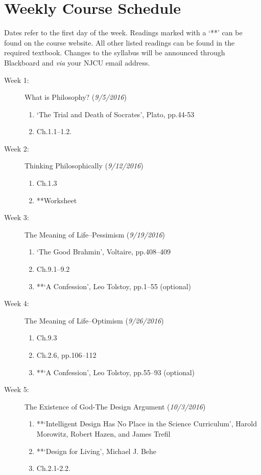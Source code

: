 \documentclass[article,oneside]{memoir}
\begin{document}
\section{Weekly Course Schedule}
Dates refer to the first day of the week. Readings marked with a `**' can be found on the course website. All other listed readings can be found in the required textbook. Changes to the syllabus will be announced through Blackboard and \emph{via} your NJCU email address. \newline





\begin{description}

\item[Week 1: ] What is Philosophy? (\emph{9/5/2016})
\begin{enumerate}
\item `The Trial and Death of Socrates', Plato, pp.44-53
\item Ch.1.1--1.2.
\end{enumerate}

\item[Week 2:]  Thinking Philosophically (\emph{9/12/2016})
\begin{enumerate}
\item Ch.1.3
\item **Worksheet
\end{enumerate}

\item[Week 3:]  The Meaning of Life--Pessimism (\emph{9/19/2016})
\begin{enumerate}
\item `The Good Brahmin', Voltaire, pp.408--409
\item Ch.9.1--9.2 
\item **`A Confession', Leo Tolstoy, pp.1--55 (optional)
\end{enumerate}

\item[Week 4: ] The Meaning of Life--Optimism (\emph{9/26/2016})
\begin{enumerate}
\item Ch.9.3
\item Ch.2.6, pp.106--112
\item **`A Confession', Leo Tolstoy, pp.55--93 (optional)
\end{enumerate}

\item[Week 5: ] The Existence of God-The Design Argument (\emph{10/3/2016})
\begin{enumerate}
\item **`Intelligent Design Has No Place in the Science Curriculum', Harold Morowitz, Robert Hazen, and James Trefil
 \item **`Design for Living', Michael J. Behe
\item Ch.2.1-2.2. 
 \end{enumerate}
 

\end{description}
\end{document}
